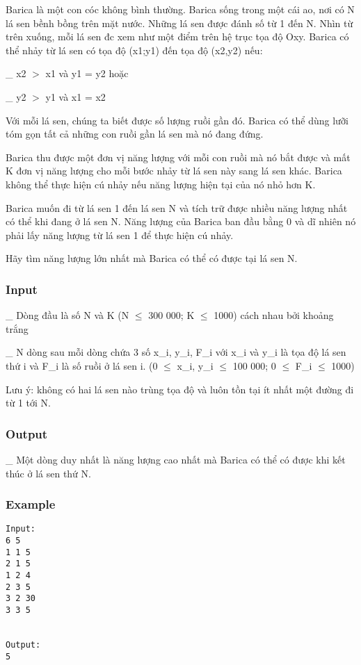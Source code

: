 



   Barica là một con cóc không bình thường. Barica sống trong một cái ao, nơi có N lá sen bềnh bồng trên mặt nước. Những lá sen được đánh số từ 1 đến N. Nhìn từ trên xuống, mỗi lá sen đc xem như một điểm trên hệ trục tọa độ Oxy. Barica có thể nhảy từ lá sen có tọa độ (x1;y1) đến tọa độ (x2,y2) nếu:   





   \_ x2 $>$ x1 và y1 = y2 hoặc   


   \_ y2 $>$ y1 và x1 = x2   





   Với mỗi  lá sen, chúng ta biết được số lượng ruồi gần đó. Barica có thể dùng lưỡi tóm gọn tất cả những con ruồi gần lá sen mà nó đang đứng.   





   Barica thu được một đơn vị năng lượng với mỗi con ruồi mà nó bắt được và mất K đơn vị năng lượng cho mỗi bước nhảy từ lá sen này sang lá sen khác. Barica không thể thực hiện cú nhảy nếu năng lượng hiện tại của nó nhỏ hơn K.   





   Barica muốn đi từ lá sen 1 đến lá sen N và tích trữ được nhiều năng lượng nhất có thể khi đang ở lá sen N. Năng lượng của Barica ban đầu bằng 0 và dĩ nhiên nó phải lấy năng lượng từ lá sen 1 để thực hiện cú nhảy.   


   Hãy tìm năng lượng lớn nhất mà Barica có thể có được tại lá sen N.  

\subsubsection{   Input  }

   \_ Dòng đầu là số N và K (N $\le$ 300 000; K $\le$ 1000) cách nhau bởi khoảng trắng   


   \_ N dòng sau mỗi dòng chứa 3 số x\_i, y\_i, F\_i với x\_i và y\_i là tọa độ lá sen thứ i và F\_i là số ruồi ở lá sen i.  (0  $\le$  x\_i, y\_i  $\le$  100 000; 0  $\le$  F\_i  $\le$ 1000)   


   Lưu ý: không có hai lá sen nào trùng tọa độ và luôn tồn tại ít nhất một đường đi từ 1 tới N.  

\subsubsection{   Output  }

   \_ Một dòng duy nhất là năng lượng cao nhất mà Barica có thể có được khi kết thúc ở lá sen thứ N.  

\subsubsection{   Example  }
\begin{verbatim}
Input:
6 5
1 1 5
2 1 5
1 2 4
2 3 5
3 2 30
3 3 5


Output:
5
\end{verbatim}
